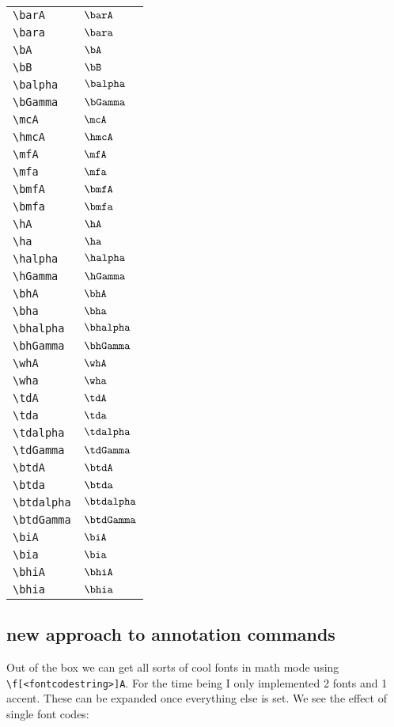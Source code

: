 \documentclass{article}
\begin{document}
\begin{tabular}{ll}
    \verb!\barA! & $\barA$ \\
    \verb!\bara! & $\bara$ \\
    \verb!\bA! & $\bA$ \\
    \verb!\bB! & $\bB$ \\
    \verb!\balpha! & $\balpha$ \\
    \verb!\bGamma! & $\bGamma$ \\
    \verb!\mcA! & $\mcA$ \\
    \verb!\hmcA! & $\hmcA$ \\
    \verb!\mfA! & $\mfA$ \\
    \verb!\mfa! & $\mfa$ \\
    \verb!\bmfA! & $\bmfA$ \\
    \verb!\bmfa! & $\bmfa$ \\
    \verb!\hA! & $\hA$ \\
    \verb!\ha! & $\ha$ \\
    \verb!\halpha! & $\halpha$ \\
    \verb!\hGamma! & $\hGamma$ \\
    \verb!\bhA! & $\bhA$ \\
    \verb!\bha! & $\bha$ \\
    \verb!\bhalpha! & $\bhalpha$ \\
    \verb!\bhGamma! & $\bhGamma$ \\
    \verb!\whA! & $\whA$ \\
    \verb!\wha! & $\wha$ \\
    \verb!\tdA! & $\tdA$ \\
    \verb!\tda! & $\tda$ \\
    \verb!\tdalpha! & $\tdalpha$ \\
    \verb!\tdGamma! & $\tdGamma$ \\
    \verb!\btdA! & $\btdA$ \\
    \verb!\btda! & $\btda$ \\
    \verb!\btdalpha! & $\btdalpha$ \\
    \verb!\btdGamma! & $\btdGamma$ \\
    \verb!\biA! & $\biA$ \\
    \verb!\bia! & $\bia$ \\
    \verb!\bhiA! & $\bhiA$ \\
    \verb!\bhia! & $\bhia$ \\
\end{tabular}


\subsection{new approach to annotation commands}
Out of the box we can get all sorts of cool fonts in math mode using \texttt{\textbackslash f[<fontcodestring>]{A}}.
For the time being I only implemented 2 fonts and 1 accent. These can be expanded once everything else is set.
We see the effect of single font codes:
\end{document}
